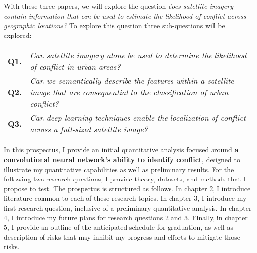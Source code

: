 With these three papers, we will explore the question \textit{does satellite imagery contain information that can be used to estimate the likelihood of conflict across geographic locations?}  To explore this question three sub-questions will be explored:\\
\noindent
\begin{tabularx}{\textwidth}{@{} l >{\raggedright\arraybackslash}X @{}}
    \textbf{Q1.} & \textit{Can satellite imagery alone be used to determine the likelihood of conflict in urban areas?} \\
    \textbf{Q2.} & \textit{Can we semantically describe the features within a satellite image that are consequential to the classification of urban conflict?} \\
    \textbf{Q3.} & \textit{Can deep learning techniques enable the localization of conflict across a full-sized satellite image?} \\
\end{tabularx}
In this prospectus, I provide an initial quantitative analysis focused around \textbf{a convolutional neural network's ability to identify conflict}, designed to illustrate my quantitative capabilities as well as preliminary results.  For the following two research questions, I provide theory, datasets, and methods that I propose to test.  The prospectus is structured as follows.  In chapter 2, I introduce literature common to each of these research topics.  In chapter 3, I introduce my first research question, inclusive of a preliminary quantitative analysis.  In chapter 4, I introduce my future plans for research questions 2 and 3.  Finally, in chapter 5, I provide an outline of the anticipated schedule for graduation, as well as description of risks that may inhibit my progress and efforts to mitigate those risks.



